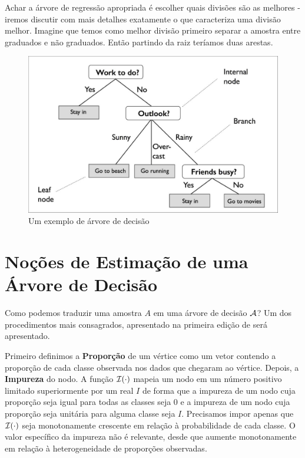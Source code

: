 Achar a árvore de regressão apropriada é escolher quais divisões são as melhores - iremos discutir com mais detalhes exatamente o que caracteriza uma divisão melhor. Imagine que temos como melhor divisão primeiro separar a amostra entre graduados e não graduados. Então partindo da raiz teríamos duas arestas. 






\begin{figure}
    \centering
    \includegraphics[scale = .25]{imagens/arvore.png}
    \caption{Um exemplo de árvore de decisão}
    \label{fig:arvore}
\end{figure}




\section{Noções de Estimação de uma Árvore de Decisão}

Como podemos traduzir uma amostra $A$ em uma árvore de decisão $\mathcal{A}$? Um dos procedimentos mais consagrados, apresentado na primeira edição de  será apresentado.

Primeiro definimos a \textbf{Proporção} de um vértice como um vetor contendo a proporção de cada classe observada nos dados que chegaram ao vértice. Depois, a \textbf{Impureza} do nodo. A função $\mathcal{I}(\cdot)$ mapeia um nodo em um número positivo limitado superiormente por um real $I$ de forma que a impureza de um nodo cuja proporção seja igual para todas as classes seja $0$ e a impureza de um nodo cuja proporção seja unitária para alguma classe seja $I$. Precisamos impor apenas que $\mathcal{I}(\cdot)$ seja monotonamente crescente em relação à probabilidade de cada classe. O valor específico da impureza não é relevante, desde que aumente monotonamente em relação à heterogeneidade de proporções observadas.

